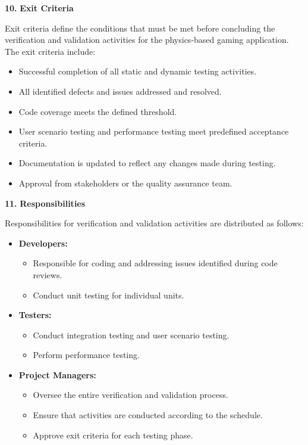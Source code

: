 \documentclass[
]{article}
\begin{document}
\protect\hypertarget{Akol}{}{}\textbf{10.} \textbf{Exit Criteria}


Exit criteria define the conditions that must be met before concluding
the verification and validation activities for the physics-based gaming
application. The exit criteria include:

\begin{itemize}
\item
  Successful completion of all static and dynamic testing activities.
\item
  All identified defects and issues addressed and resolved.
\item
  Code coverage meets the defined threshold.
\item
  User scenario testing and performance testing meet predefined
  acceptance criteria.
\item
  Documentation is updated to reflect any changes made during testing.
\item
  Approval from stakeholders or the quality assurance team.
\end{itemize}


\protect\hypertarget{Ahhhh}{}{}\textbf{11.} \textbf{Responsibilities}


Responsibilities for verification and validation activities are
distributed as follows:

\begin{itemize}
\item
  \textbf{Developers:}

  \begin{itemize}
  \item
    Responsible for coding and addressing issues identified during code
    reviews.
  \item
    Conduct unit testing for individual units.
  \end{itemize}
\item
  \textbf{Testers:}

  \begin{itemize}
  \item
    Conduct integration testing and user scenario testing.
  \item
    Perform performance testing.
  \end{itemize}
\item
  \textbf{Project Managers:}

  \begin{itemize}
  \item
    Oversee the entire verification and validation process.
  \item
    Ensure that activities are conducted according to the schedule.
  \item
    Approve exit criteria for each testing phase.
  \end{itemize}
\end{itemize}
\end{document}
